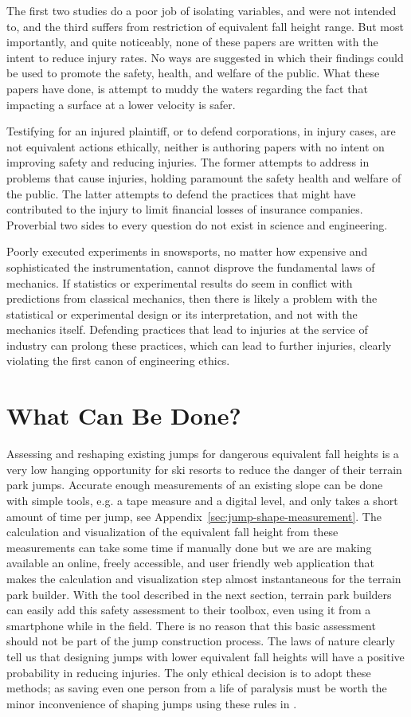 \documentclass{article}
\begin{document}
The first two studies do a poor job of isolating variables, and were not
intended to, and the third suffers from restriction of equivalent fall height
range. But most importantly, and quite noticeably, none of these papers are
written with the intent to reduce injury rates. No ways are suggested in which
their findings could be used to promote the safety, health, and welfare of the
public. What these papers have done, is attempt to muddy the waters regarding the
fact that impacting a surface at a lower velocity is safer.

Testifying for an injured plaintiff, or to defend corporations, in injury
cases, are not equivalent actions ethically, neither is authoring papers with
no intent on improving safety and reducing injuries. The former attempts to
address in problems that cause injuries, holding paramount the safety health
and welfare of the public. The latter attempts to defend the practices that
might have contributed to the injury to limit financial losses of insurance
companies. Proverbial two sides to every question do not exist in science and
engineering.

Poorly executed experiments in snowsports, no matter how expensive and
sophisticated the instrumentation, cannot disprove the fundamental
laws of  mechanics. If statistics or experimental results do seem in
conflict with predictions from classical mechanics, then there is likely a problem
with the statistical or experimental design or its interpretation, and not
with the mechanics itself. Defending practices that lead to injuries at the
service of industry can prolong these practices, which can lead to further
injuries, clearly violating the first canon of engineering ethics.

\section{What Can Be Done?}
%
Assessing and reshaping existing jumps for dangerous equivalent fall heights is
a very low hanging opportunity for ski resorts to reduce the danger of their
terrain park jumps. Accurate enough measurements of an existing slope can be
done with simple tools, e.g. a tape measure and a digital level, and only takes
a short amount of time per jump, see Appendix~\ref{sec:jump-shape-measurement}.
The calculation and visualization of the equivalent fall height from these
measurements can take some time if manually done but we are are making
available an online, freely accessible, and user friendly web application that
makes the calculation and visualization step almost instantaneous for the
terrain park builder. With the tool described in the next section, terrain park
builders can easily add this safety assessment to their toolbox, even using it
from a smartphone while in the field. There is no reason that this basic
assessment should not be part of the jump construction process. The laws of
nature clearly tell us that designing jumps with lower equivalent fall heights
will have a positive probability in reducing injuries.  The only ethical
decision is to adopt these methods; as saving even one person from a life of
paralysis must be worth the minor inconvenience of shaping jumps using these
rules in \cite{Levy2015}.
\end{document}

